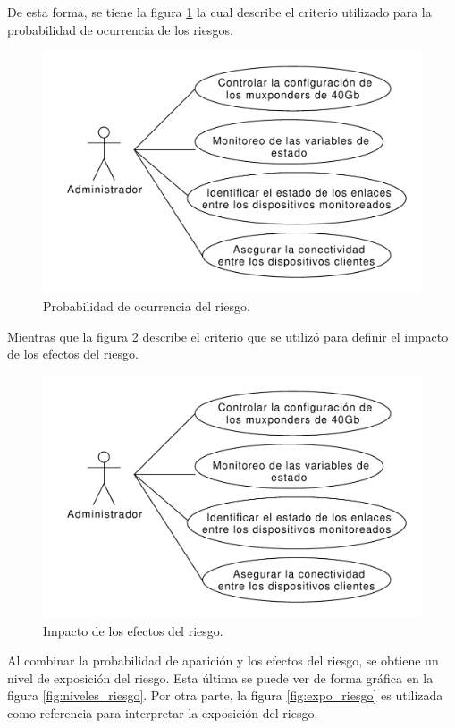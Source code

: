 De esta forma, se tiene la figura \ref{fig:probabilidad_riesgo} la cual describe el criterio utilizado para la probabilidad de ocurrencia de los riesgos.

\begin{figure}[H]
  \centering
  \includegraphics[scale=0.53]{Figures/caso_uso_admin.pdf}
  \caption{Probabilidad de ocurrencia del riesgo.}
  \label{fig:probabilidad_riesgo}
\end{figure}

Mientras que la figura \ref{fig:efectos_riesgo} describe el criterio que se utilizó para definir el impacto de los efectos del riesgo. 

\begin{figure}[H]
  \centering
  \includegraphics[scale=0.53]{Figures/caso_uso_admin.pdf}
  \caption{Impacto de los efectos del riesgo.}
  \label{fig:efectos_riesgo}
\end{figure}

Al combinar la probabilidad de aparición y los efectos del riesgo, se obtiene un nivel de exposición del riesgo. Esta última se puede ver de forma gráfica en la figura \ref{fig:niveles_riesgo}. Por otra parte, la figura \ref{fig:expo_riesgo} es utilizada como referencia para interpretar la exposición del riesgo.

